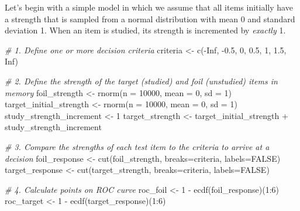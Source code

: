 \documentclass[
]{book}
\newenvironment{Shaded}{\begin{snugshade}}{\end{snugshade}}
\newcommand{\AttributeTok}[1]{\textcolor[rgb]{0.77,0.63,0.00}{#1}}
\newcommand{\CommentTok}[1]{\textcolor[rgb]{0.56,0.35,0.01}{\textit{#1}}}
\newcommand{\ConstantTok}[1]{\textcolor[rgb]{0.00,0.00,0.00}{#1}}
\newcommand{\DecValTok}[1]{\textcolor[rgb]{0.00,0.00,0.81}{#1}}
\newcommand{\FloatTok}[1]{\textcolor[rgb]{0.00,0.00,0.81}{#1}}
\newcommand{\FunctionTok}[1]{\textcolor[rgb]{0.00,0.00,0.00}{#1}}
\newcommand{\NormalTok}[1]{#1}
\newcommand{\OtherTok}[1]{\textcolor[rgb]{0.56,0.35,0.01}{#1}}
\newcommand{\SpecialCharTok}[1]{\textcolor[rgb]{0.00,0.00,0.00}{#1}}
\begin{document}
Let's begin with a simple model in which we assume that all items initially have a strength that is sampled from a normal distribution with mean 0 and standard deviation 1. When an item is studied, its strength is incremented by \emph{exactly} 1.

\begin{Shaded}
\begin{Highlighting}[]
\CommentTok{\# 1. Define one or more decision criteria}
\NormalTok{criteria }\OtherTok{\textless{}{-}} \FunctionTok{c}\NormalTok{(}\SpecialCharTok{{-}}\ConstantTok{Inf}\NormalTok{, }\SpecialCharTok{{-}}\FloatTok{0.5}\NormalTok{, }\DecValTok{0}\NormalTok{, }\FloatTok{0.5}\NormalTok{, }\DecValTok{1}\NormalTok{, }\FloatTok{1.5}\NormalTok{, }\ConstantTok{Inf}\NormalTok{)}

\CommentTok{\# 2. Define the strength of the target (studied) and foil (unstudied) items in memory}
\NormalTok{foil\_strength }\OtherTok{\textless{}{-}} \FunctionTok{rnorm}\NormalTok{(}\AttributeTok{n =} \DecValTok{10000}\NormalTok{, }\AttributeTok{mean =} \DecValTok{0}\NormalTok{, }\AttributeTok{sd =} \DecValTok{1}\NormalTok{)}
\NormalTok{target\_initial\_strength }\OtherTok{\textless{}{-}} \FunctionTok{rnorm}\NormalTok{(}\AttributeTok{n =} \DecValTok{10000}\NormalTok{, }\AttributeTok{mean =} \DecValTok{0}\NormalTok{, }\AttributeTok{sd =} \DecValTok{1}\NormalTok{)}
\NormalTok{study\_strength\_increment }\OtherTok{\textless{}{-}} \DecValTok{1}
\NormalTok{target\_strength }\OtherTok{\textless{}{-}}\NormalTok{ target\_initial\_strength }\SpecialCharTok{+}\NormalTok{ study\_strength\_increment}

\CommentTok{\# 3. Compare the strengths of each test item to the criteria to arrive at a decision}
\NormalTok{foil\_response }\OtherTok{\textless{}{-}} \FunctionTok{cut}\NormalTok{(foil\_strength, }\AttributeTok{breaks=}\NormalTok{criteria, }\AttributeTok{labels=}\ConstantTok{FALSE}\NormalTok{)}
\NormalTok{target\_response }\OtherTok{\textless{}{-}} \FunctionTok{cut}\NormalTok{(target\_strength, }\AttributeTok{breaks=}\NormalTok{criteria, }\AttributeTok{labels=}\ConstantTok{FALSE}\NormalTok{)}

\CommentTok{\# 4. Calculate points on ROC curve}
\NormalTok{roc\_foil }\OtherTok{\textless{}{-}} \DecValTok{1} \SpecialCharTok{{-}} \FunctionTok{ecdf}\NormalTok{(foil\_response)(}\DecValTok{1}\SpecialCharTok{:}\DecValTok{6}\NormalTok{)}
\NormalTok{roc\_target }\OtherTok{\textless{}{-}} \DecValTok{1} \SpecialCharTok{{-}} \FunctionTok{ecdf}\NormalTok{(target\_response)(}\DecValTok{1}\SpecialCharTok{:}\DecValTok{6}\NormalTok{)}


\end{Highlighting}
\end{Shaded}
\end{document}
